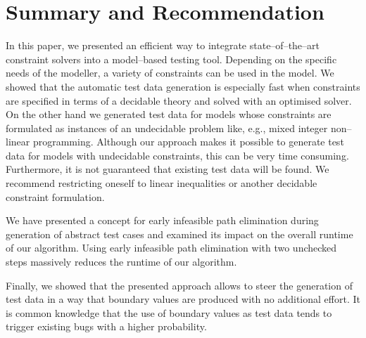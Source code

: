 \documentclass[runningheads,a4paper]{llncs}%
\begin{document}
\section{Summary and Recommendation}%
\label{sec:Recommendation}%
In this paper, we presented an efficient way to integrate state--of--the--art
constraint solvers into a model--based testing tool. Depending on the specific
needs of the modeller, a variety of constraints can be used in the model.
We showed that the automatic test data generation is especially fast when
constraints are specified in terms of a decidable theory and solved with an
optimised solver. On the other hand we generated test data for models whose
constraints are formulated as instances of an undecidable problem like, e.g.,
mixed integer non--linear programming. Although our approach makes it possible
to generate test data for models with undecidable constraints, this can be very
time consuming. Furthermore, it is not guaranteed that existing test data will
be found. We recommend restricting oneself to linear inequalities or another
decidable constraint formulation.

We have presented a concept for early infeasible path elimination during
generation of abstract test cases and examined its impact on the overall runtime
of our algorithm. Using early infeasible path elimination with two unchecked
steps massively reduces the runtime of our algorithm.

Finally, we showed that the presented approach allows to steer the generation of
test data in a way that boundary values are produced with no additional effort.
It is common knowledge that the use of boundary values as test data tends to
trigger existing bugs with a higher probability.

%
%
\end{document}
